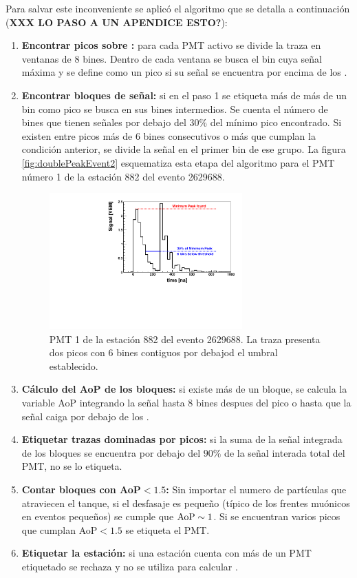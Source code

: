 	Para salvar este inconveniente se aplicó el algoritmo que se detalla a continuación (\textbf{XXX LO PASO A UN APENDICE ESTO?}):
	\begin{enumerate}
	 \item \textbf{Encontrar picos sobre :} para cada PMT activo se divide la traza en ventanas de 8 bines. Dentro de cada ventana se busca el bin cuya señal máxima y se define como un pico si su señal se encuentra por encima de los .
	 \item \textbf{Encontrar bloques de señal:} si en el paso 1 se etiqueta más de más de un bin como pico se busca en sus bines intermedios.
	 Se cuenta el número de bines que tienen señales por debajo del $30\%$ del mínimo pico encontrado. 
	 Si existen entre picos más de 6 bines consecutivos o más que cumplan la condición anterior, se divide la señal en el primer bin de ese grupo.
	 La figura \ref{fig:doublePeakEvent2} esquematiza esta etapa del algoritmo para el PMT número 1 de la estación 882 del evento 2629688.
	 \begin{figure}[ht]
	 \begin{center}
	 \includegraphics[width=0.7\textwidth]{fig/seleccionAuger/ev2629688_pmt1_anode}
	\caption{PMT 1 de la estación 882 del evento 2629688. La traza presenta dos picos con 6 bines contiguos por debajod el umbral establecido.}
	\label{fig:doublePeakEvent}
	\end{center}
	\end{figure}
	 \item \textbf{Cálculo del AoP de los bloques:} si existe más de un bloque, se calcula la variable AoP integrando la señal hasta 8 bines despues del pico o hasta que la señal caiga por debajo de los .
	 \item \textbf{Etiquetar trazas dominadas por picos:} si la suma de la señal integrada de los bloques se encuentra por debajo del $90\%$ de la señal interada total del PMT, no se lo etiqueta.
	 \item \textbf{Contar bloques con AoP$<1.5$:} Sin importar el numero de partículas que atraviecen el tanque, si el desfasaje es pequeño (típico de los frentes muónicos en eventos pequeños) se cumple que ${\rm AoP}\sim 1$. Si se encuentran varios picos que cumplan AoP$<1.5$ se etiqueta el PMT.
	 \item \textbf{Etiquetar la estación:} si una estación cuenta con más de un PMT etiquetado se rechaza y no se utiliza para calcular \aop{}.
	\end{enumerate}

